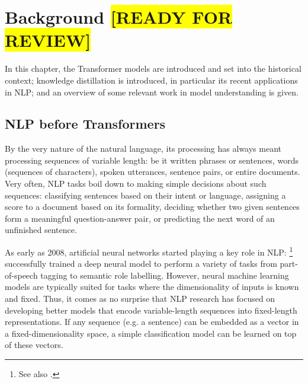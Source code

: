 \documentclass[bsc,frontabs,twoside,singlespacing,parskip,deptreport]{infthesis}
\def\reviewready{\colorbox{yellow}{[READY FOR REVIEW]}}
\begin{document}
\chapter{Background \reviewready}{
  \label{ch:background}

  In this chapter, the Transformer models are introduced and set into the historical context; knowledge distillation is introduced, in particular its recent applications in NLP; and an overview of some relevant work in model understanding is given.

  \section{NLP before Transformers}{
    \label{sec:pre-transformer-nlp}
    By the very nature of the natural language, its processing has always meant processing sequences of variable length: be it written phrases or sentences, words (sequences of characters), spoken utterances, sentence pairs, or entire documents.
    Very often, NLP tasks boil down to making simple decisions about such sequences: classifying sentences based on their intent or language, assigning a score to a document based on its formality, deciding whether two given sentences form a meaningful question-answer pair, or predicting the next word of an unfinished sentence.

    As early as 2008, artificial neural networks started playing a key role in NLP: \citet{Collobert_Weston_2008}\footnote{See also \citet{Collobert_Weston_2011}.} successfully trained a deep neural model to perform a variety of tasks from part-of-speech tagging to semantic role labelling.
    However, neural machine learning models are typically suited for tasks where the dimensionality of inputs is known and fixed. Thus, it comes as no surprise that NLP research has focused on developing better models that encode variable-length sequences into fixed-length representations. 
    If any sequence (e.g. a sentence) can be embedded as a vector in a fixed-dimensionality space, a simple classification model can be learned on top of these vectors.
    
}}
\end{document}
